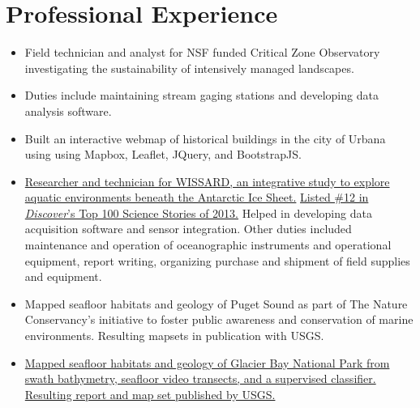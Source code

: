 \section{Professional Experience}

\begin{itemize}
\item Field technician and analyst for NSF funded Critical Zone Observatory investigating the sustainability of intensively managed landscapes. 
\item Duties include maintaining stream gaging stations and developing data analysis software.
\end{itemize}

\begin{itemize}
\item Built an interactive webmap of historical buildings in the city of Urbana using using Mapbox, Leaflet, JQuery, and BootstrapJS. 

\end{itemize}

\begin{itemize}
\item \href{http://www.wissard.org}{Researcher and technician for WISSARD, an
  integrative study to explore aquatic environments beneath the Antarctic Ice
  Sheet.}
  \href{http://discovermagazine.com/2014/jan-feb/12-the-search-for-life-trapped-under-ice}
       {Listed \#12 in \textit{Discover}'s Top 100 Science Stories of 2013.} Helped in developing data acquisition software and sensor integration.
       Other duties included maintenance and operation of oceanographic instruments and operational equipment,
       report writing, organizing purchase and shipment of field supplies and equipment.
  
\item Mapped seafloor habitats and geology of Puget Sound as part of The Nature
  Conservancy's initiative to foster public awareness and conservation of marine
  environments. Resulting mapsets in publication with USGS.

\item \href{http://pubs.usgs.gov/sim/3253/}{Mapped seafloor habitats and geology
  of Glacier Bay National Park from swath bathymetry, seafloor video transects, and a supervised classifier. Resulting report and map set published by USGS.}
  
\end{itemize}

